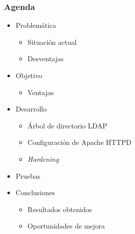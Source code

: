 \documentclass{beamer}
\title
  [\PresentationTitle \hspace{25em} \thepage] %
  {\PresentationTitle}                        %
\author{\AuthorName} %
\institute[\UniversityShortName] %
{
\small
\UniversityName \\ %
\medskip
\FacultyName \\
\medskip
\CollegeMajor
}
\date{\PresentationDate} %
\begin{document}
\begin{frame}
\titlepage
\end{frame}
\begin{frame}
\frametitle{Agenda}

\begin{itemize}
  \item Problem\'{a}tica
  \begin{itemize}
    \item Situaci\'{o}n actual
    \item Desventajas
  \end{itemize}
  \item Objetivo
  \begin{itemize}
    \item Ventajas
  \end{itemize}
  \item Desarrollo
  \begin{itemize}
    \item \'{A}rbol de directorio \textup{LDAP}
    \item Configuraci\'{o}n de Apache \textup{HTTPD}
    \item \textsl{Hardening}
  \end{itemize}
  \item Pruebas
  \item Conclusiones
  \begin{itemize}
    \item Resultados obtenidos
    \item Oportunidades de mejora
  \end{itemize}
\end{itemize}

\end{frame}
\end{document}
